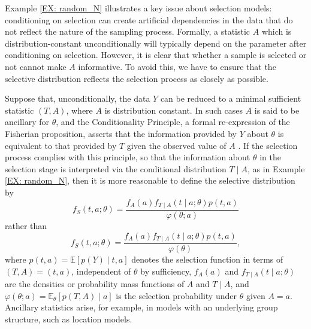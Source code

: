 \documentclass[pdflatex,sn-chicago]{sn-jnl}%
\theoremstyle{thmstyleone}%
\theoremstyle{thmstyletwo}%
\theoremstyle{thmstylethree}%
\begin{document}
Example \ref{EX: random_N} illustrates a key issue about selection models: conditioning on selection can create artificial dependencies in the data that do not reflect the nature of the sampling process. Formally, a statistic $A$ which is distribution-constant unconditionally will typically depend on the parameter after conditioning on selection. However, it is clear that whether a sample is selected or not cannot make $A$ informative. To avoid this, we have to ensure that the selective distribution reflects the selection process as closely as possible.  

Suppose that, unconditionally, the data $Y$ can be reduced to a minimal sufficient statistic $(T, A)$, where $A$ is distribution constant. In such cases $A$ is said to be ancillary for $\theta$, and the Conditionality Principle, a formal re-expression of the Fisherian proposition, asserts that the information provided by $Y$ about $\theta$ is equivalent to that provided by $T$ given the observed value of $A$ \citep{birnbaum}. If the selection process complies with this principle, so that the information about $\theta$ in the selection stage is interpreted via the conditional distribution $T\mid A$, as in Example \ref{EX: random_N}, then it is more reasonable to define the selective distribution by
\begin{equation*}
f_S(t, a; \theta) = \frac{f_A(a) f_{T\mid A}(t\mid a; \theta) p(t, a)}{\varphi(\theta; a)}
\end{equation*}
rather than
\begin{equation*}
f_S(t, a; \theta) = \frac{f_A(a) f_{T\mid A}(t\mid a; \theta) p(t, a)}{\varphi(\theta)},
\end{equation*}
where $p(t, a) = \mathbb{E}[p(Y)\mid t, a]$ denotes the selection function in terms of $(T, A) = (t, a)$, independent of $\theta$ by sufficiency, $f_A(a)$ and $f_{T\mid A}(t\mid a;\theta)$ are the densities or probability mass functions of $A$ and $T\mid A$, and $\varphi(\theta; a) = \mathbb{E}_\theta[p(T, A)\mid a]$ is the selection probability under $\theta$ given $A = a$. Ancillary statistics arise, for example, in models with an underlying group structure, such as location models.
\end{document}
